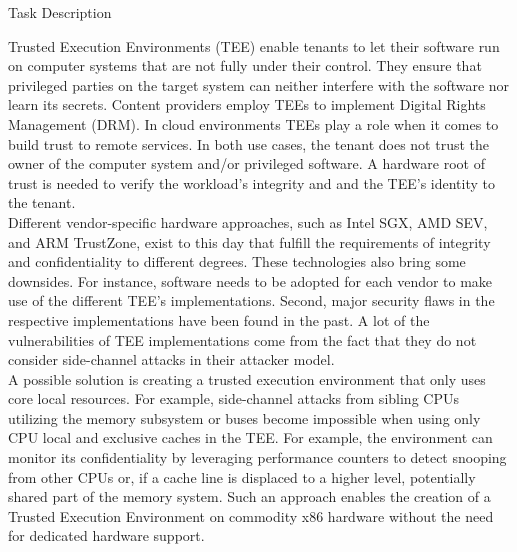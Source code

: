 \begin{center}
  \Large
  Task Description
\end{center}

Trusted Execution Environments (TEE) enable tenants to let their software run on
computer systems that are not fully under their control. They ensure that
privileged parties on the target system can neither interfere with the software
nor learn its secrets. Content providers employ TEEs to implement Digital Rights
Management (DRM). In cloud environments TEEs play a role when it comes to build
trust to remote services. In both use cases, the tenant does not trust the owner
of the computer system and/or privileged software. A hardware root of trust is
needed to verify the workload's integrity and and the TEE's identity to the
tenant.\\

Different vendor-specific hardware approaches, such as Intel SGX, AMD SEV, and
ARM TrustZone, exist to this day that fulfill the requirements of integrity and
confidentiality to different degrees. These technologies also bring some
downsides. For instance, software needs to be adopted for each vendor to make
use of the different TEE's implementations. Second, major security flaws in the
respective implementations have been found in the past. A lot of the
vulnerabilities of TEE implementations come from the fact that they do not
consider side-channel attacks in their attacker model.\\

A possible solution is creating a trusted execution environment that only uses
core local resources. For example, side-channel attacks from sibling CPUs
utilizing the memory subsystem or buses become impossible when using only CPU
local and exclusive caches in the TEE. For example, the environment can monitor
its confidentiality by leveraging performance counters to detect snooping from
other CPUs or, if a cache line is displaced to a higher level, potentially
shared part of the memory system. Such an approach enables the creation of a
Trusted Execution Environment on commodity x86 hardware without the need for
dedicated hardware support.\\

